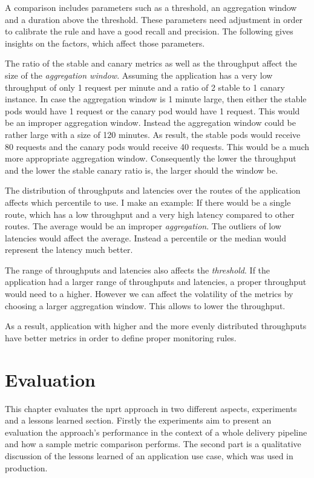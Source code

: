 A comparison includes parameters such as a threshold, an aggregation window and a duration
above the threshold. These parameters need adjustment in order to calibrate the rule and
have a good recall and precision. The following gives insights on the factors, which
affect those parameters.

The ratio of the stable and canary metrics as well as the throughput affect the size of
the \emph{aggregation window}. Assuming the application has a very low throughput of only
1 request per minute and a ratio of 2 stable to 1 canary instance. In case the aggregation
window is 1 minute large, then either the stable pods would have 1 request or the canary
pod would have 1 request. This would be an improper aggregation window. Instead the
aggregation window could be rather large with a size of 120 minutes. As result, the stable
pods would receive 80 requests and the canary pods would receive 40 requests. This would
be a much more appropriate aggregation window. Consequently the lower the throughput and
the lower the stable canary ratio is, the larger should the window be.

The distribution of throughputs and latencies over the routes of the application affects
which percentile to use. I make an example: If there would be a single route, which has a
low throughput and a very high latency compared to other routes. The average would be an
improper \emph{aggregation}. The outliers of low latencies would affect the
average. Instead a percentile or the median would represent the latency much better.

The range of throughputs and latencies also affects the \emph{threshold}. If the
application had a larger range of throughputs and latencies, a proper throughput would
need to a higher. However we can affect the volatility of the metrics by choosing a larger
aggregation window. This allows to lower the throughput.

As a result, application with higher and the more evenly distributed throughputs have
better metrics in order to define proper monitoring rules.

\chapter{Evaluation}
\label{chap:eval}

This chapter evaluates the \gls{nprt} approach in two different aspects, experiments and a
lessons learned section. Firstly the experiments aim to present an evaluation the
approach's performance in the context of a whole delivery pipeline and how a sample metric
comparison performs. The second part is a qualitative discussion of the lessons learned of
an application use case, which was used in production.

